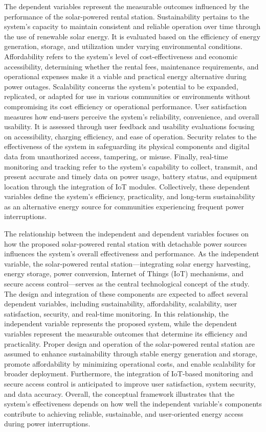 {The dependent variables represent the measurable outcomes influenced by the performance of the solar-powered rental station. Sustainability pertains to the system’s capacity to maintain consistent and reliable operation over time through the use of renewable solar energy. It is evaluated based on the efficiency of energy generation, storage, and utilization under varying environmental conditions. Affordability refers to the system’s level of cost-effectiveness and economic accessibility, determining whether the rental fees, maintenance requirements, and operational expenses make it a viable and practical energy alternative during power outages. Scalability concerns the system’s potential to be expanded, replicated, or adapted for use in various communities or environments without compromising its cost efficiency or operational performance. User satisfaction measures how end-users perceive the system’s reliability, convenience, and overall usability. It is assessed through user feedback and usability evaluations focusing on accessibility, charging efficiency, and ease of operation. Security relates to the effectiveness of the system in safeguarding its physical components and digital data from unauthorized access, tampering, or misuse. Finally, real-time monitoring and tracking refer to the system’s capability to collect, transmit, and present accurate and timely data on power usage, battery status, and equipment location through the integration of IoT modules. Collectively, these dependent variables define the system’s efficiency, practicality, and long-term sustainability as an alternative energy source for communities experiencing frequent power interruptions.

The relationship between the independent and dependent variables focuses on how the proposed solar-powered rental station with detachable power sources influences the system’s overall effectiveness and performance. As the independent variable, the solar-powered rental station—integrating solar energy harvesting, energy storage, power conversion, Internet of Things (IoT) mechanisms, and secure access control—serves as the central technological concept of the study. The design and integration of these components are expected to affect several dependent variables, including sustainability, affordability, scalability, user satisfaction, security, and real-time monitoring. In this relationship, the independent variable represents the proposed system, while the dependent variables represent the measurable outcomes that determine its efficiency and practicality. Proper design and operation of the solar-powered rental station are assumed to enhance sustainability through stable energy generation and storage, promote affordability by minimizing operational costs, and enable scalability for broader deployment. Furthermore, the integration of IoT-based monitoring and secure access control is anticipated to improve user satisfaction, system security, and data accuracy. Overall, the conceptual framework illustrates that the system’s effectiveness depends on how well the independent variable’s components contribute to achieving reliable, sustainable, and user-oriented energy access during power interruptions.

}
